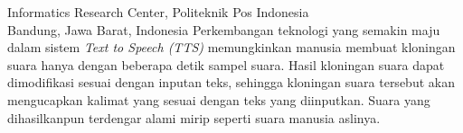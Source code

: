 

{Informatics Research Center, Politeknik Pos Indonesia\\
Bandung, Jawa Barat, Indonesia}
Perkembangan teknologi yang semakin maju dalam sistem \textit{Text to Speech (TTS)}  memungkinkan manusia membuat kloningan suara hanya dengan beberapa detik sampel suara. Hasil kloningan suara dapat dimodifikasi sesuai dengan inputan teks, sehingga kloningan suara tersebut akan mengucapkan kalimat yang sesuai dengan teks yang diinputkan. Suara yang dihasilkanpun terdengar alami mirip seperti suara manusia aslinya.